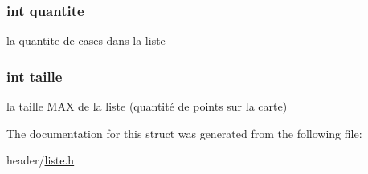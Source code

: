 \hypertarget{struct_liste_a94d4d4dd15d5aa428d2b1589e6f264d4}{
\subsubsection[{quantite}]{\setlength{\rightskip}{0pt plus 5cm}int quantite}}\label{struct_liste_a94d4d4dd15d5aa428d2b1589e6f264d4}


la quantite de cases dans la liste 

\hypertarget{struct_liste_a29bf3fc0ffe4e72e45f0c84ab4f8cd1e}{
\subsubsection[{taille}]{\setlength{\rightskip}{0pt plus 5cm}int taille}}\label{struct_liste_a29bf3fc0ffe4e72e45f0c84ab4f8cd1e}


la taille M\-A\-X de la liste (quantité de points sur la carte) 



The documentation for this struct was generated from the following file\-:\begin{DoxyCompactItemize}
\item 
header/\hyperlink{liste_8h}{liste.\-h}\end{DoxyCompactItemize}
